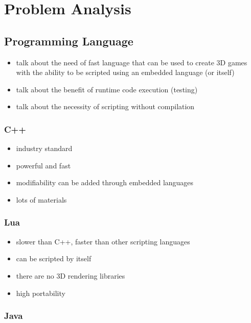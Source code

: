 \chapter{Problem Analysis}


\section{Programming Language}

\begin{itemize}
    \item talk about the need of fast language that can be used to create
        3D games with the ability to be scripted using an embedded language
        (or itself)
    \item talk about the benefit of runtime code execution (testing)
    \item talk about the necessity of scripting without compilation
\end{itemize}

\subsection{C++}

\begin{itemize}
    \item industry standard
    \item powerful and fast
    \item modifiability can be added through embedded languages
    \item lots of materials
\end{itemize}

\subsection{Lua}

\begin{itemize}
    \item slower than C++, faster than other scripting languages
    \item can be scripted by itself
    \item there are no 3D rendering libraries
    \item high portability
\end{itemize}

\subsection{Java}

